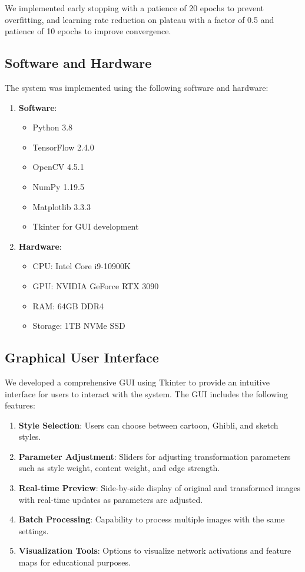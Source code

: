 \documentclass[conference]{IEEEtran}
\begin{document}
We implemented early stopping with a patience of 20 epochs to prevent overfitting, and learning rate reduction on plateau with a factor of 0.5 and patience of 10 epochs to improve convergence.

\subsection{Software and Hardware}
The system was implemented using the following software and hardware:

\begin{enumerate}
    \item \textbf{Software}:
    \begin{itemize}
        \item Python 3.8
        \item TensorFlow 2.4.0
        \item OpenCV 4.5.1
        \item NumPy 1.19.5
        \item Matplotlib 3.3.3
        \item Tkinter for GUI development
    \end{itemize}
    
    \item \textbf{Hardware}:
    \begin{itemize}
        \item CPU: Intel Core i9-10900K
        \item GPU: NVIDIA GeForce RTX 3090
        \item RAM: 64GB DDR4
        \item Storage: 1TB NVMe SSD
    \end{itemize}
\end{enumerate}

\subsection{Graphical User Interface}
We developed a comprehensive GUI using Tkinter to provide an intuitive interface for users to interact with the system. The GUI includes the following features:

\begin{enumerate}
    \item \textbf{Style Selection}: Users can choose between cartoon, Ghibli, and sketch styles.
    
    \item \textbf{Parameter Adjustment}: Sliders for adjusting transformation parameters such as style weight, content weight, and edge strength.
    
    \item \textbf{Real-time Preview}: Side-by-side display of original and transformed images with real-time updates as parameters are adjusted.
    
    \item \textbf{Batch Processing}: Capability to process multiple images with the same settings.
    
    \item \textbf{Visualization Tools}: Options to visualize network activations and feature maps for educational purposes.
\end{enumerate}
\end{document}

